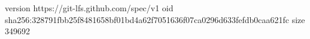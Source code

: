 version https://git-lfs.github.com/spec/v1
oid sha256:328791fbb25f8481658bf01bd4a62f7051636f07ca0296d633fefdb0caa621fc
size 349692
